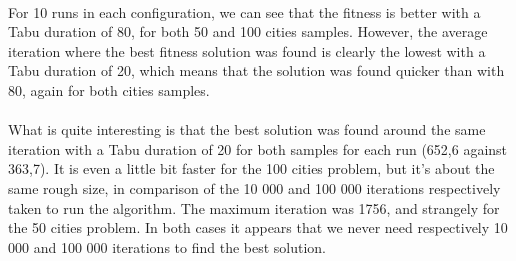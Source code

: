 \documentclass[12pt,oneside,a4paper]{article}
\begin{document}
  \begin{table}[h]
    \caption{Average of the paramaters for the four configurations}
  \end{table}
  \paragraph{}
  For 10 runs in each configuration, we can see that the fitness is better 
  with a Tabu duration of 80, for both 50 and 100 cities samples. However, 
  the average iteration where the best fitness solution was found is clearly the 
  lowest with a Tabu duration of 20, which means that the solution was found quicker 
  than with 80, again for both cities samples. 
  \paragraph{}What is quite interesting is that the best solution 
  was found around the same iteration with a Tabu duration of 20 for both samples for each run (652,6 against 363,7). 
  It is even a little bit faster for the 100 cities problem, but it's about the same rough size, in comparison of the 10 000 and 100 000 iterations respectively
   taken to run the algorithm.
  The maximum iteration was 1756, and strangely for the 50 cities problem. In both cases it appears that we 
  never need respectively 10 000 and 100 000 iterations to find the best solution.
\end{document}
